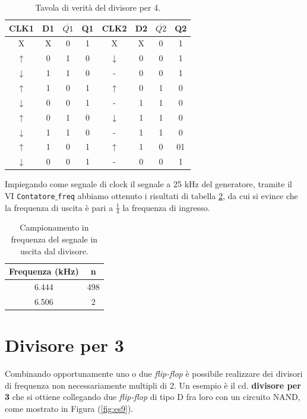 \documentclass[journal, a4paper]{IEEEtran}
\begin{document}
\begin{table}[htp]
\centering
\caption{Tavola di verità del divisore per 4.}
\label{tab:4}
\begin{tabular}{|c|c|c|c|c|c|c|c|}
\hline 
CLK1 & D1 & $\overline{Q1}$ & Q1 & CLK2 & D2 & $\overline{Q2}$ & Q2 \\ 
\hline 
X & X & 0 & 1 & X & X & 0 & 1 \\ 
\hline 
$\uparrow$ & 0 & 1 & 0 & $\downarrow$ & 0 & 0 & 1 \\ 
\hline 
$\downarrow$ & 1 & 1 & 0 & - & 0 & 0 & 1 \\ 
\hline 
$\uparrow$ & 1 & 0 & 1 & $\uparrow$ & 0 & 1 & 0 \\ 
\hline 
$\downarrow$ & 0& 0 & 1 & - & 1 & 1 & 0 \\ 
\hline 
$\uparrow$ & 0 & 1 & 0 & $\downarrow$ & 1 & 1 & 0 \\ 
\hline 
$\downarrow$ & 1 & 1 & 0 & - & 1 & 1 & 0 \\ 
\hline 
$\uparrow$ & 1 & 0 & 1 & $\uparrow$ & 1 & 0 & 01\\ 
\hline 
$\downarrow$ & 0 & 0 & 1 & - & 0 & 0 & 1 \\ 
\hline
\end{tabular} 
\end{table}

Impiegando come segnale di clock il segnale a 25 kHz del generatore, tramite il VI \texttt{Contatore$\_$freq} abbiamo ottenuto i risultati di tabella \ref{tab:div4}, da cui si evince che la frequenza di uscita è pari a $\frac{1}{4}$ la frequenza di ingresso.

\begin{table}[htp]
\centering
\caption{Campionamento in frequenza del segnale in uscita dal divisore.}
\label{tab:div4}
\begin{tabular}{|c|c|}
\hline 
Frequenza (kHz) & n \\ 
\hline 
6.444 & 498 \\ 
\hline 
6.506 & 2 \\ 
\hline 
\end{tabular} 
\end{table}

\section{Divisore per 3}
Combinando opportunamente uno o due \textit{flip-flop} è possibile realizzare dei divisori di frequenza non necessariamente multipli di 2. Un esempio è il cd. \textbf{divisore per 3} che si ottiene collegando due \textit{flip-flop} di tipo \textsc{D} fra loro con un circuito \textsc{NAND}, come mostrato in Figura (\ref{fig:es9}).\\
\end{document}
